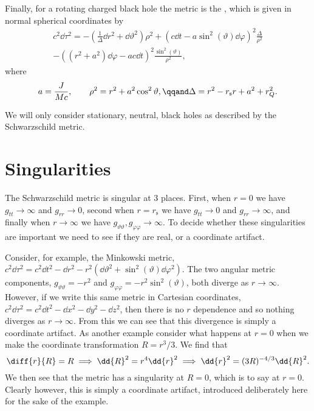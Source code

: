 \documentclass[fleqn]{NotesClass}
\begin{document}
    Finally, for a rotating charged black hole the metric is the , which is given in normal spherical coordinates by
    \begin{multline}
        c^2\dd{\tau}^2 = -\left( \frac{1}{\Delta} \dd{r}^2 + \dd{\vartheta}^2 \right)\rho^2 + (c\dd{t} - a\sin^2(\vartheta)\dd{\varphi})^2\frac{\Delta}{\rho^2}\\
        - ((r^2 + a^2)\dd{\varphi} - ac\dd{t})^2\frac{\sin^2(\vartheta)}{\rho^2},
    \end{multline}
    where
    \begin{equation}
        a = \frac{J}{Mc}, \qquad \rho^2 = r^2 + a^2\cos^2\vartheta, \qqand \Delta = r^2 - r_{\mathrm{s}}r + a^2 + r_Q^2.
    \end{equation}
    
    We will only consider stationary, neutral, black holes as described by the Schwarzschild metric.
    
    \section{Singularities}
    The Schwarzschild metric is singular at 3 places.
    First, when \(r = 0\) we have \(g_{tt} \to \infty\) and \(g_{rr} \to 0\), second when \(r = r_{\mathrm{s}}\) we have \(g_{tt} \to 0\) and \(g_{rr} \to \infty\), and finally when \(r \to \infty\) we have \(g_{\vartheta\vartheta}, g_{\varphi\varphi} \to \infty\).
    To decide whether these singularities are important we need to see if they are real, or a coordinate artifact.
    
    Consider, for example, the Minkowski metric, \(c^2\dd{\tau}^2 = c^2\dd{t}^2 - \dd{r}^2 - r^2(\dd{\vartheta}^2 + \sin^2(\vartheta)\dd{\varphi}^2)\).
    The two angular metric components, \(g_{\vartheta\vartheta} = -r^2\) and \(g_{\varphi\varphi} = -r^2\sin^2(\vartheta)\), both diverge as \(r \to \infty\).
    However, if we write this same metric in Cartesian coordinates, \(c^2\dd{\tau}^2 = c^2\dd{t}^2 - \dd{x}^2 - \dd{y}^2 - \dd{z}^2\), then there is no \(r\) dependence and so nothing diverges as \(r \to \infty\).
    From this we can see that this divergence is simply a coordinate artifact.
    As another example consider what happens at \(r = 0\) when we make the coordinate transformation \(R = r^3/3\).
    We find that
    \begin{equation}
        \diff{r}{R} = R \implies \dd{R}^2 = r^4\dd{r}^2 \implies \dd{r}^2 = (3R)^{-4/3}\dd{R}^2.
    \end{equation}
    We then see that the metric has a singularity at \(R = 0\), which is to say at \(r = 0\).
    Clearly however, this is simply a coordinate artifact, introduced deliberately here for the sake of the example.
    
\end{document}
